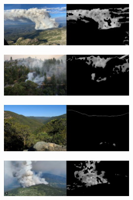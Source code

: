 \begin{figure}
\centering
\includegraphics[width=0.6\textwidth,height=\textheight]{results0.png}
\caption{}
\end{figure}

\label{r0}{}

\begin{figure}
\centering
\includegraphics[width=0.6\textwidth,height=\textheight]{results1.png}
\caption{}
\end{figure}

\label{r1}{}

\begin{figure}
\centering
\includegraphics[width=0.6\textwidth,height=\textheight]{results2.png}
\caption{}
\end{figure}

\label{r2}{}

\begin{figure}
\centering
\includegraphics[width=0.6\textwidth,height=\textheight]{results3.png}
\caption{}
\end{figure}

\label{r3}{}
